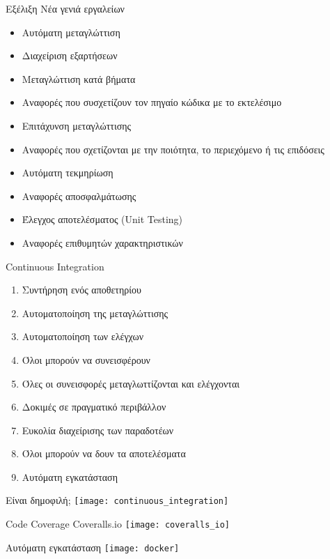 \documentclass[xetex]{beamer}
\begin{document}
\begin{frame}{Εξέλιξη}
	Νέα γενιά εργαλείων
	\begin{itemize}
		\item Αυτόματη μεταγλώττιση
		\item Διαχείριση εξαρτήσεων
		\item Μεταγλώττιση κατά βήματα
		\item Αναφορές που συσχετίζουν τον πηγαίο κώδικα με το εκτελέσιμο
		\item Επιτάχυνση μεταγλώττισης
		\item Αναφορές που σχετίζονται με την ποιότητα, το περιεχόμενο ή τις επιδόσεις
		\item Αυτόματη τεκμηρίωση
		\item Αναφορές αποσφαλμάτωσης
		\item Έλεγχος αποτελέσματος (Unit Testing)
		\item Αναφορές επιθυμητών χαρακτηριστικών
	\end{itemize}
\end{frame}

\begin{frame}{Continuous Integration}
	\begin{enumerate}[<+->]
	\item Συντήρηση ενός αποθετηρίου
	\item Αυτοματοποίηση της μεταγλώττισης
	\item Αυτοματοποίηση των ελέγχων
	\item Όλοι μπορούν να συνεισφέρουν
	\item Όλες οι συνεισφορές μεταγλωττίζονται και ελέγχονται
	\item Δοκιμές σε πραγματικό περιβάλλον
	\item Ευκολία διαχείρισης των παραδοτέων
	\item Όλοι μπορούν να δουν τα αποτελέσματα
	\item Αυτόματη εγκατάσταση
	\end{enumerate}
\end{frame}

\begin{frame}{Είναι δημοφιλή;}
	\texttt{[image: continuous\_integration]}
\end{frame}

\begin{frame}{Code Coverage}
	Coveralls.io
	\texttt{[image: coveralls\_io]}
\end{frame}

\begin{frame}{Αυτόματη εγκατάσταση}
	\texttt{[image: docker]}
\end{frame}
\end{document}
